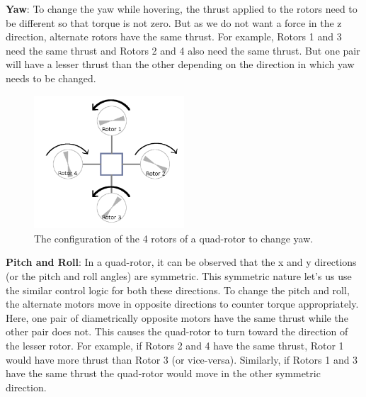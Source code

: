 \documentclass[BTech]{iitmdiss}
\begin{document}
{\bf Yaw}: To change the yaw while hovering, the thrust applied to the rotors need to be different so that torque is not zero. But as we do not want a force in the z direction, alternate rotors have the same thrust. For example, Rotors 1 and 3 need the same thrust and Rotors 2 and 4 also need the same thrust. But one pair will have a lesser thrust than the other depending on the direction in which yaw needs to be changed.

\begin{figure}[h]
  \centering
    \includegraphics[width=0.5\textwidth]{quadrotor_rotors_yaw.png}
    \caption{The configuration of the 4 rotors of a quad-rotor to change yaw.}
\end{figure}

{\bf Pitch and Roll}: In a quad-rotor, it can be observed that the x and y directions (or the pitch and roll angles) are symmetric. This symmetric nature let's us use the similar control logic for both these directions. To change the pitch and roll, the alternate motors move in opposite directions to counter torque appropriately. Here, one pair of diametrically opposite motors have the same thrust while the other pair does not. This causes the quad-rotor to turn toward the direction of the lesser rotor. For example, if Rotors 2 and 4 have the same thrust, Rotor 1 would have more thrust than Rotor 3 (or vice-versa). Similarly, if Rotors 1 and 3 have the same thrust the quad-rotor would move in the other symmetric direction.
\end{document}
